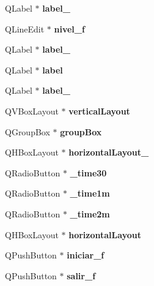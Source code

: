 \begin{DoxyCompactItemize}
Q\+Label $\ast$ {\bfseries label\+\_}
\item 
\mbox{\label{class_ui__formulario_a3d5db997713bc30a9f20d16092441080}} 
Q\+Line\+Edit $\ast$ {\bfseries nivel\+\_\+f}
\item 
\mbox{\label{class_ui__formulario_a4eef5c0c7669bbe578b530c5f025a872}} 
Q\+Label $\ast$ {\bfseries label\+\_}
\item 
\mbox{\label{class_ui__formulario_a01aa3e6190f0def8916f1de5fdbc2a19}} 
Q\+Label $\ast$ {\bfseries label}
\item 
\mbox{\label{class_ui__formulario_a611d0d4995c49e0ae456fa4547049722}} 
Q\+Label $\ast$ {\bfseries label\+\_}
\item 
\mbox{\label{class_ui__formulario_a06dc5970f85d46fc441d0b9cc7a07ed9}} 
Q\+V\+Box\+Layout $\ast$ {\bfseries vertical\+Layout}
\item 
\mbox{\label{class_ui__formulario_a10c6c602eb53bc4080d499f28e759993}} 
Q\+Group\+Box $\ast$ {\bfseries group\+Box}
\item 
\mbox{\label{class_ui__formulario_ade4529bd28a172fb01439ca729a6d941}} 
Q\+H\+Box\+Layout $\ast$ {\bfseries horizontal\+Layout\+\_}
\item 
\mbox{\label{class_ui__formulario_a663e6cc3bc1fb2dcfafe9eb21c73d77c}} 
Q\+Radio\+Button $\ast$ {\bfseries \+\_\+time30}
\item 
\mbox{\label{class_ui__formulario_ab0008ff96eedba3e8950fd21e0ed63b6}} 
Q\+Radio\+Button $\ast$ {\bfseries \+\_\+time1m}
\item 
\mbox{\label{class_ui__formulario_a81f140f35ac785327f4f0750bc49a52a}} 
Q\+Radio\+Button $\ast$ {\bfseries \+\_\+time2m}
\item 
\mbox{\label{class_ui__formulario_aba283363cef42f80b2b58fe963ceb497}} 
Q\+H\+Box\+Layout $\ast$ {\bfseries horizontal\+Layout}
\item 
\mbox{\label{class_ui__formulario_ae3320a587fcb6b360a9de7026ccb8d3b}} 
Q\+Push\+Button $\ast$ {\bfseries iniciar\+\_\+f}
\item 
\mbox{\label{class_ui__formulario_a5b382fc89d08aab8d3e27e67c2a845bc}} 
Q\+Push\+Button $\ast$ {\bfseries salir\+\_\+f}
\end{DoxyCompactItemize}


